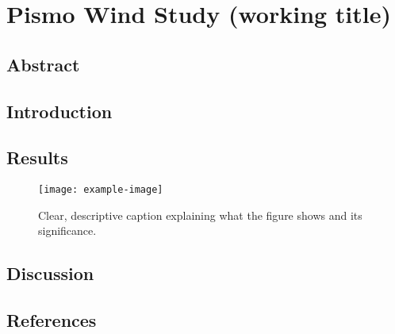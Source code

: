 \chapter{Pismo Wind Study (working title)}

\section{Abstract}

\section{Introduction}
\lipsum[1]  %



\section{Results}
\lipsum[2]  %


\begin{figure}[htbp]
    \centering
    \texttt{[image: example-image]}
    \caption{Clear, descriptive caption explaining what the figure shows and its significance.}
\end{figure}

\section{Discussion}
\lipsum[3]  %

\section{References}
